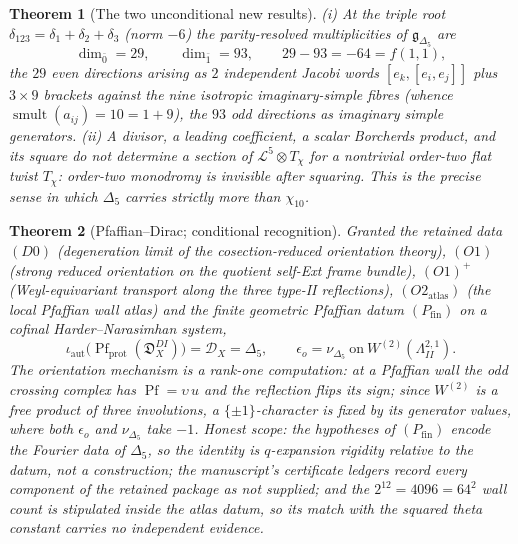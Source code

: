\documentclass[11pt]{article}
\providecommand{\cD}{\mathcal{D}}
\providecommand{\cL}{\mathcal{L}}
\providecommand{\fg}{\mathfrak{g}}
\providecommand{\fD}{\mathfrak{D}}
\providecommand{\Dfive}{\Delta_5}
\providecommand{\Pf}{\operatorname{Pf}}
\providecommand{\smult}{\operatorname{smult}}
\newtheorem{theorem}{Theorem}[section]
\begin{document}
\begin{theorem}[The two unconditional new results]\label{thm:new}
\textup{(i)} At the triple root
$\delta_{123}=\delta_1+\delta_2+\delta_3$ \textup{(norm $-6$)} the
parity-resolved multiplicities of $\fg_{\Dfive}$ are
\[
\dim_{\bar0}=29,\qquad \dim_{\bar1}=93,\qquad 29-93=-64=f(1,1),
\]
the $29$ even directions arising as $2$ independent Jacobi words
$[e_k,[e_i,e_j]]$ plus $3\times9$ brackets against the nine isotropic
imaginary-simple fibres \textup{(whence $\smult(a_{ij})=10=1+9$)}, the
$93$ odd directions as imaginary simple generators.
\textup{(ii)} A divisor, a leading coefficient, a scalar Borcherds
product, and its square do not determine a section of
$\cL^{5}\otimes T_\chi$ for a nontrivial order-two flat twist
$T_\chi$: order-two monodromy is invisible after squaring. This is
the precise sense in which $\Dfive$ carries strictly more than
$\chi_{10}$.
\end{theorem}

\begin{theorem}[Pfaffian--Dirac; conditional recognition]
\label{thm:pfdirac}
Granted the retained data $(D0)$ \textup{(degeneration limit of the
cosection-reduced orientation theory)}, $(O1)$ \textup{(strong reduced
orientation on the quotient self-Ext frame bundle)}, $(O1)^+$
\textup{(Weyl-equivariant transport along the three type-II
reflections)}, $(O2_{\mathrm{atlas}})$ \textup{(the local Pfaffian
wall atlas)} and the finite geometric Pfaffian datum
$(P_{\mathrm{fin}})$ on a cofinal Harder--Narasimhan system,
\[
\iota_{\mathrm{aut}}\bigl(\Pf_{\mathrm{prot}}(\fD^{DI}_X)\bigr)
=\cD_X=\Dfive,
\qquad
\epsilon_o=\nu_{\Dfive}\ \text{on}\ W^{(2)}(\Lambda^{2,1}_{II}).
\]
The orientation mechanism is a rank-one computation: at a Pfaffian
wall the odd crossing complex has $\Pf=\upsilon\,u$ and the
reflection flips its sign; since $W^{(2)}$ is a free product of three
involutions, a $\{\pm1\}$-character is fixed by its generator values,
where both $\epsilon_o$ and $\nu_{\Dfive}$ take $-1$. Honest scope:
the hypotheses of $(P_{\mathrm{fin}})$ encode the Fourier data of
$\Dfive$, so the identity is $q$-expansion rigidity relative to the
datum, not a construction; the manuscript's certificate ledgers record
every component of the retained package as not supplied; and the
$2^{12}=4096=64^2$ wall count is stipulated inside the atlas datum,
so its match with the squared theta constant carries no independent
evidence.
\end{theorem}
\end{document}
